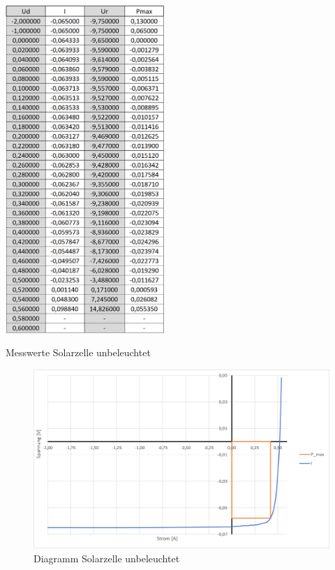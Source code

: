 \documentclass[a4paper]{scrartcl}
\numberwithin{equation}{subsection}
\begin{document}
\begin{table}[H]
\includegraphics[width=6cm]{Tabelle_beleuchtet}
\centering
\caption{Messwerte Solarzelle unbeleuchtet}
\label{tab:beleuchtet}
\end{table}

\begin{figure}[H]
\includegraphics[width=14cm]{Diagramm_beleuchtet}
\centering
\caption{Diagramm Solarzelle unbeleuchtet}
\centering
\label{fig:beleuchtet}
\end{figure}

\newpage






\label{LastPage}
\end{document}
